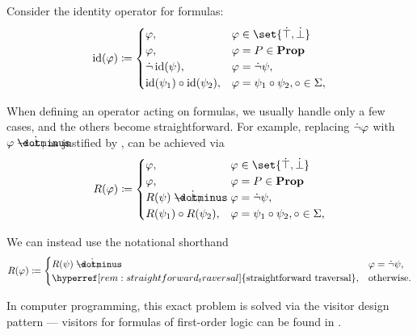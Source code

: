 \begin{remark}\label{rem:straightforward_traversal}
  Consider the identity operator for formulas:
  \begin{equation*}
    \begin{aligned}
      \id(\varphi) \coloneqq \begin{cases}
        \varphi,                          &\varphi \in \set{ \syntop, \synbot } \\
        \varphi,                          &\varphi = P \in \boldop{Prop} \\
        \synneg \id(\psi),                &\varphi = \synneg \psi, \\
        \id(\psi_1) \bincirc \id(\psi_2), &\varphi = \psi_1 \bincirc \psi_2, \bincirc \in \Sigma, \\
      \end{cases}
    \end{aligned}
  \end{equation*}

  When defining an operator acting on formulas, we usually handle only a few cases, and the others become straightforward. For example, replacing \( \dot\neg \varphi \) with \( \varphi \synimplies \synbot \), as justified by , can be achieved via
  \begin{equation*}
    \begin{aligned}
      R(\varphi) \coloneqq \begin{cases}
        \varphi,                      &\varphi \in \set{ \syntop, \synbot } \\
        \varphi,                      &\varphi = P \in \boldop{Prop} \\
        R(\psi) \synimplies \synbot,  &\varphi = \synneg \psi, \\
        R(\psi_1) \bincirc R(\psi_2), &\varphi = \psi_1 \bincirc \psi_2, \bincirc \in \Sigma, \\
      \end{cases}
    \end{aligned}
  \end{equation*}

  We can instead use the notational shorthand
  \begin{equation*}
    \begin{aligned}
      R(\varphi) \coloneqq \begin{cases}
        R(\psi) \synimplies \synbot,                                             &\varphi = \synneg \psi, \\
        \hyperref[rem:straightforward_traversal]{\T{straightforward traversal}}, &\T{otherwise.}
      \end{cases}
    \end{aligned}
  \end{equation*}

  In computer programming, this exact problem is solved via the visitor design pattern --- visitors for formulas of first-order logic can be found in \cite{code}.
\end{remark}

